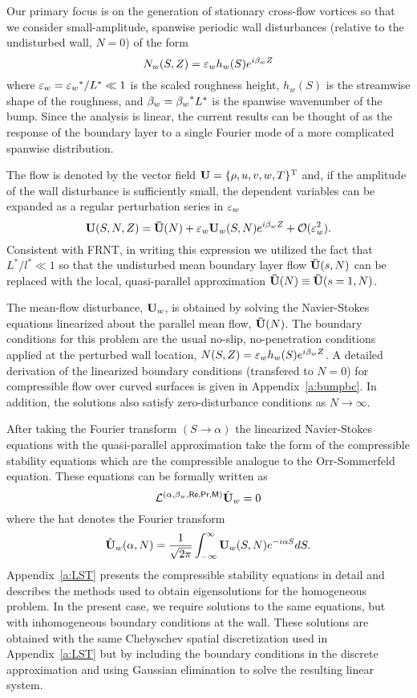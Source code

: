 Our primary focus is on the generation of stationary cross-flow vortices so
that we consider small-amplitude, spanwise periodic wall disturbances
(relative to the undisturbed wall, $N=0$) of the form
%
\begin{equation} \label{e:bump}
  N_w(S,Z) = {\varepsilon_w} h_w(S) e^{i {\beta_{w}} Z}
\end{equation}
%
where ${\varepsilon_w} = {\varepsilon_w}^* / L^* \ll 1$ is the scaled roughness height, $h_w(S)$ is
the streamwise shape of the roughness, and ${\beta_{w}} = {\beta_{w}}^* L^*$ is the spanwise
wavenumber of the bump.  Since the analysis is linear, the current results can
be thought of as the response of the boundary layer to a single Fourier mode
of a more complicated spanwise distribution.

The flow is denoted by the vector field ${\bf U} = \{\rho,u,v,w,T\}^{\rm T}$ and,
if the amplitude of the wall disturbance is sufficiently small, the dependent
variables can be expanded as a regular perturbation series in ${\varepsilon_w}$
%
\begin{equation}
  {\bf U}(S,N,Z) = {\bf \bar U}(N) + {\varepsilon_w} {\bf U}_w(S,N) e^{i {\beta_{w}} Z} + {\cal O}({\varepsilon^2_w}) .
\end{equation}
%
Consistent with FRNT, in writing this expression we utilized the fact that
$L^*/l^* \ll 1$ so that the undisturbed mean boundary layer flow ${\bf \bar U}(s,N)$
can be replaced with the local, quasi-parallel approximation ${\bf \bar U}(N) \equiv
{\bf \bar U}(s=1,N)$.

The mean-flow disturbance, ${\bf U}_w$, is obtained by solving the Navier-Stokes
equations linearized about the parallel mean flow, ${\bf \bar U}(N)$.  The boundary
conditions for this problem are the usual no-slip, no-penetration conditions
applied at the perturbed wall location, $N(S,Z) = {\varepsilon_w} h_w(S) e^{i {\beta_{w}} Z}$.  A
detailed derivation of the linearized boundary conditions (transfered to
$N=0$) for compressible flow over curved surfaces is given in
Appendix~\ref{a:bumpbc}.  In addition, the solutions also satisfy
zero-disturbance conditions as $N \rightarrow \infty$.

After taking the Fourier transform $(S \rightarrow \alpha)$ the linearized
Navier-Stokes equations with the quasi-parallel approximation take the form of
the compressible stability equations which are the compressible analogue to
the Orr-Sommerfeld equation.  These equations can be formally written as
%
\begin{equation}
  {\cal L}^{(\alpha,{\beta_{w}},{\sf Re},{\sf Pr},{\sf M})} \hat {{\bf U}}_w = 0
\end{equation}
%
where the hat denotes the Fourier transform
%
\begin{equation}
  \hat {{\bf U}}_w(\alpha,N) = \frac{1}{\sqrt{2\pi}} \int_{-\infty}^{\infty} 
                         {\bf U}_w(S,N) e^{-i \alpha S} dS .
\end{equation}
%
Appendix~\ref{a:LST} presents the compressible stability equations in detail
and describes the methods used to obtain eigensolutions for the homogeneous
problem.  In the present case, we require solutions to the same equations, but
with inhomogeneous boundary conditions at the wall.  These solutions are
obtained with the same Chebyschev spatial discretization used in
Appendix~\ref{a:LST} but by including the boundary conditions in the discrete
approximation and using Gaussian elimination to solve the resulting linear
system.

